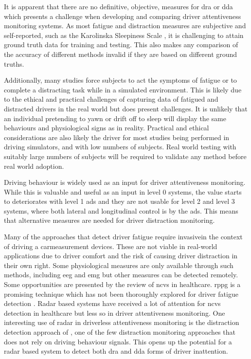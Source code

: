 \documentclass[11pt, parskip=half*,twoside=false]{scrbook}
\begin{document}
{It is apparent that there are no definitive, objective, measures for \gls{dra} or \gls{dda} which presents a challenge when developing and comparing driver attentiveness monitoring systems. As most fatigue and distraction measures are subjective and self-reported, such as the Karolinska Sleepiness Scale \citep{kaidaValidationKarolinskaSleepiness2006}, it is challenging to attain ground truth data for training and testing. This also makes any comparison of the accuracy of different methods invalid if they are based on different ground truths. 

Additionally, many studies force subjects to act the symptoms of fatigue or to complete a distracting task while in a simulated environment. This is likely due to the ethical and practical challenges of capturing data of fatigued and distracted drivers in the real world but does present challenges. It is unlikely that an individual pretending to yawn or drift off to sleep will display the same behaviours and physiological signs as in reality. Practical and ethical considerations are also likely the driver for most studies being performed in driving simulators, and with low numbers of subjects. Real world testing with suitably large numbers of subjects will be required to validate any method before real world adoption.

Driving behaviour is widely used as an input for driver attentiveness monitoring. While this is valuable and useful as an input in level 0 systems, the value starts to deteriorates with level 1 \gls{ads} and they are not usable for level 2 and level 3 systems, where both lateral and longitudinal control is by the \gls{ads}. This means that alternative measures are needed for driver distraction monitoring. 

Many of the approaches that detect driver fatigue require invasive\textemdash in the context of driving a car\textemdash measurement devices. These are not viable in real-world applications due to driver comfort and the risk of causing driver distraction in their own right. Some physiological measures are only available through such methods, including \gls{eeg} and \gls{emg} but other measures can be detected remotely. Some opportunities are presented by the review of \gls{ncvs} in healthcare. \Gls{rppg} is a promising technique which has not been thoroughly explored for driver fatigue detection \citep{sikanderDriverFatigueDetection2019}. Radar based systems have received a lot of attention for \gls{ncvs} detection in healthcare \citep{sikanderDriverFatigueDetection2019} but less so in driver attentiveness monitoring. One interesting use of radar in driverless attentiveness monitoring is the distraction detection approach of \citet{dingInattentiveDrivingBehavior2019}, one of the few distraction monitoring approaches that does not rely on driving behaviour signals. This opens up the potential for a radar based system to detect both \gls{dra} and \gls{dda} forms of driver inattention.


}
\end{document}
